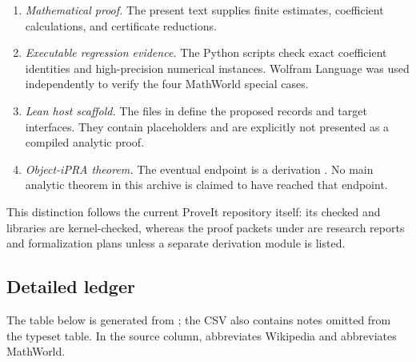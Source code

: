 \begin{enumerate}
\item \emph{Mathematical proof.}  The present text supplies finite estimates,
coefficient calculations, and certificate reductions.
\item \emph{Executable regression evidence.}  The Python scripts check exact
coefficient identities and high-precision numerical instances.  Wolfram
Language was used independently to verify the four MathWorld special cases.
\item \emph{Lean host scaffold.}  The files in  define the proposed
records and target interfaces.  They contain placeholders and are explicitly
not presented as a compiled analytic proof.
\item \emph{Object-iPRA theorem.}  The eventual endpoint is a derivation
.  No main analytic theorem in this archive is claimed
to have reached that endpoint.
\end{enumerate}

This distinction follows the current ProveIt repository itself: its checked
 and  libraries are kernel-checked,
whereas the proof packets under  are research reports and
formalization plans unless a separate derivation module is listed.

\subsection{Detailed ledger}

The table below is generated from ; the CSV also
contains notes omitted from the typeset table.  In the source column,
 abbreviates Wikipedia and  abbreviates MathWorld.


